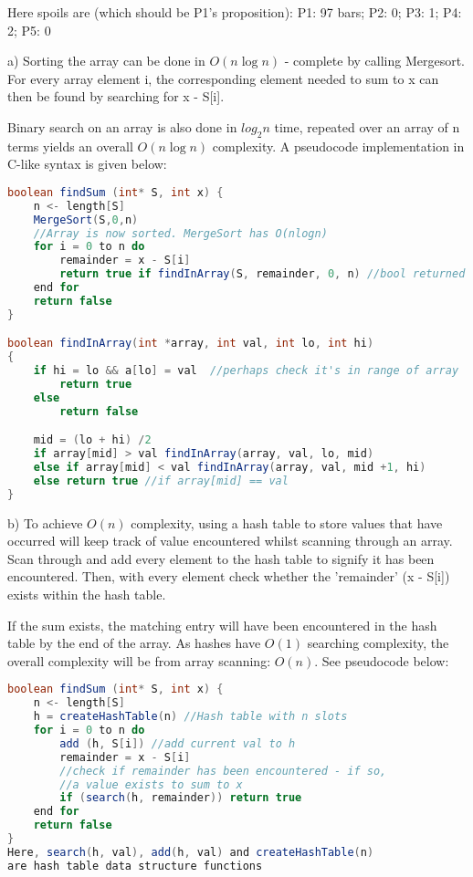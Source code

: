 \documentclass[11pt, a4paper]{article}
\begin{document}
Here spoils are (which should be P1's proposition):
P1: 97 bars; P2: 0; P3: 1; P4: 2; P5: 0 


a) Sorting the array can be done in $O(n\log{}n)$ - complete by calling Mergesort.
For every array element i, the corresponding element needed to sum to x can then be found by searching for x - S[i].

Binary search on an array is also done in $log_2 n$ time, repeated over an array of n terms yields an overall $O(n\log{}n)$ complexity. A pseudocode implementation in C-like syntax is given below:

\begin{lstlisting}[frame=single, language=java]
boolean findSum (int* S, int x) {
    n <- length[S]
    MergeSort(S,0,n)
    //Array is now sorted. MergeSort has O(nlogn)
    for i = 0 to n do
        remainder = x - S[i]
        return true if findInArray(S, remainder, 0, n) //bool returned
    end for
    return false
}

boolean findInArray(int *array, int val, int lo, int hi)
{
    if hi = lo && a[lo] = val  //perhaps check it's in range of array
        return true
    else 
        return false

    mid = (lo + hi) /2
    if array[mid] > val findInArray(array, val, lo, mid)
    else if array[mid] < val findInArray(array, val, mid +1, hi)
    else return true //if array[mid] == val 
}
\end{lstlisting}

b) To achieve $O(n)$ complexity, using a hash table to store values that have occurred will keep track of value encountered whilst scanning through an array.
Scan through and add every element to the hash table to signify it has been encountered.
Then, with every element check whether the 'remainder' (x - S[i]) exists within the hash table.

If the sum exists, the matching entry will have been encountered in the hash table by the end of the array.  As hashes have $O(1)$ searching complexity, the overall complexity will be from array scanning: $O(n)$. See pseudocode below:

\begin{lstlisting}[frame=single, language=java]
boolean findSum (int* S, int x) {
    n <- length[S]
    h = createHashTable(n) //Hash table with n slots
    for i = 0 to n do
        add (h, S[i]) //add current val to h
        remainder = x - S[i]
        //check if remainder has been encountered - if so,
        //a value exists to sum to x
        if (search(h, remainder)) return true
    end for
    return false
}
Here, search(h, val), add(h, val) and createHashTable(n) 
are hash table data structure functions
\end{lstlisting}
\end{document}

